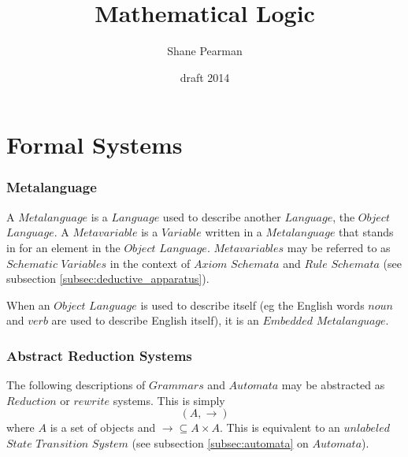 \documentclass{article}
\begin{document}
\setcounter{secnumdepth}{5}
\setcounter{tocdepth}{5}


\title{Mathematical Logic}
\date{draft 2014}
\author{Shane Pearman}
\maketitle


\tableofcontents

\part{Formal Systems}


\section{Metalanguage}

A $Metalanguage$ is a $Language$ used to describe another $Language$,
the $Object$ $Language$. A $Metavariable$ is a $Variable$ written in a
$Metalanguage$ that stands in for an element in the $Object$
$Language$. $Metavariables$ may be referred to as $Schematic$
$Variables$ in the context of $Axiom$ $Schemata$ and $Rule$ $Schemata$
(see subsection \ref{subsec:deductive_apparatus}).

When an $Object$ $Language$ is used to describe itself (eg the English
words $noun$ and $verb$ are used to describe English itself), it is
an $Embedded$ $Metalanguage$.


\section{Abstract Reduction Systems}
The following descriptions of $Grammars$ and $Automata$ may be
abstracted as $Reduction$ or $rewrite$ systems. This is simply
    \[(A,\rightarrow)\]
where $A$ is a set of objects and $\rightarrow \subseteq A \times
A$. This is equivalent to an $unlabeled$ $State$ $Transition$ $System$
(see subsection \ref{subsec:automata} on $Automata$).
\end{document}
